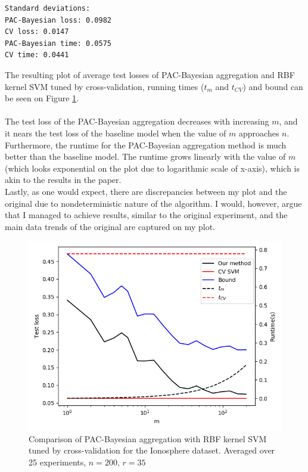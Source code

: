 \documentclass[a4paper]{article}
\begin{document}
\begin{verbatim}
Standard deviations:
PAC-Bayesian loss: 0.0982
CV loss: 0.0147
PAC-Bayesian time: 0.0575
CV time: 0.0441
\end{verbatim}
The resulting plot of average test losses of PAC-Bayesian aggregation and RBF
kernel SVM tuned by cross-validation, running times ($t_m$ and $t_{CV}$) and
bound can be seen on Figure \ref{plt1}.\\\\
The test loss of the PAC-Bayesian aggregation decreases with increasing
$m$, and it nears the test loss of the baseline model when the value of $m$
approaches $n$. \\
Furthermore, the runtime for the PAC-Bayesian aggregation method
is much better than the baseline model. The runtime grows linearly with the
value of $m$ (which looks exponential on the plot due to logarithmic scale of
x-axis), which is akin to the results in the paper. \\
Lastly, as one would expect, there are discrepancies between my plot and the
original due to nondeterministic nature of the algorithm. I would, however, argue
that I managed to achieve results, similar to the original experiment, and
the main data trends of the original are captured on my plot.

\newpage
\vspace*{\fill}
\begin{figure}[H]
  \centering
  \includegraphics[width=\textwidth]{code/plt_avg25_2}
  \caption{Comparison of PAC-Bayesian aggregation with RBF kernel SVM
    tuned by cross-validation for the Ionosphere dataset. Averaged over 25 experiments, $n=200$, $r=35$}
  \label{plt1}
\end{figure}
\vspace*{\fill}
\end{document}
